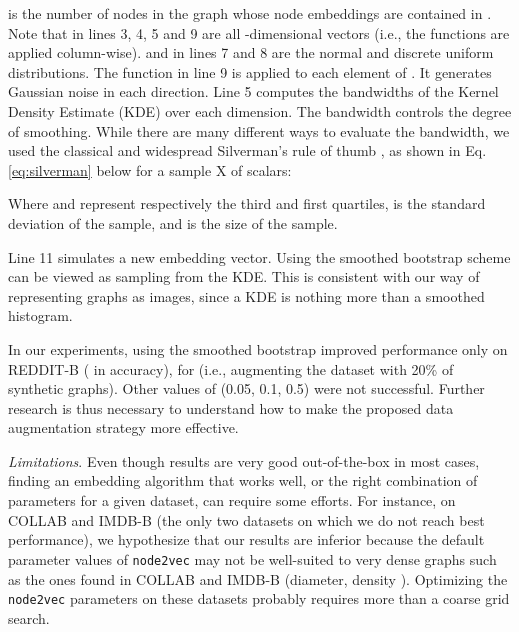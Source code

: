 \documentclass[runningheads]{llncs}
\begin{document}
\vspace{-0.8cm}

 is the number of nodes in the graph whose node embeddings are contained in . Note that  in lines 3, 4, 5 and 9 are all -dimensional vectors (i.e., the functions are applied column-wise).  and  in lines 7 and 8 are the normal and discrete uniform distributions. The function  in line 9 is applied to each element of . It generates Gaussian noise in each direction.
Line 5 computes the bandwidths of the Kernel Density Estimate (KDE) over each dimension. The bandwidth controls the degree of smoothing. While there are many different ways to evaluate the bandwidth, we used the classical and widespread Silverman's rule of thumb \cite{silverman1986density}, as shown in Eq. \ref{eq:silverman} below for a sample X of  scalars:



Where  and  represent respectively the third and first quartiles,  is the standard deviation of the sample, and  is the size of the sample.

Line 11 simulates a new embedding vector. Using the smoothed bootstrap scheme can be viewed as sampling from the KDE. This is consistent with our way of representing graphs as images, since a KDE is nothing more than a smoothed histogram.

In our experiments, using the smoothed bootstrap improved performance only on REDDIT-B ( in accuracy), for  (i.e., augmenting the dataset with 20\% of synthetic graphs). Other values of  (0.05, 0.1, 0.5) were not successful. Further research is thus necessary to understand how to make the proposed data augmentation strategy more effective.

\textit{Limitations}. Even though results are very good out-of-the-box in most cases, finding an embedding algorithm that works well, or the right combination of parameters for a given dataset, can require some efforts. For instance, on COLLAB and IMDB-B (the only two datasets on which we do not reach best performance), we hypothesize that our results are inferior because the default parameter values of \texttt{node2vec} may not be well-suited to very dense graphs such as the ones found in COLLAB and IMDB-B (diameter, density ). Optimizing the \texttt{node2vec} parameters on these datasets probably requires more than a coarse grid search.
\end{document}
